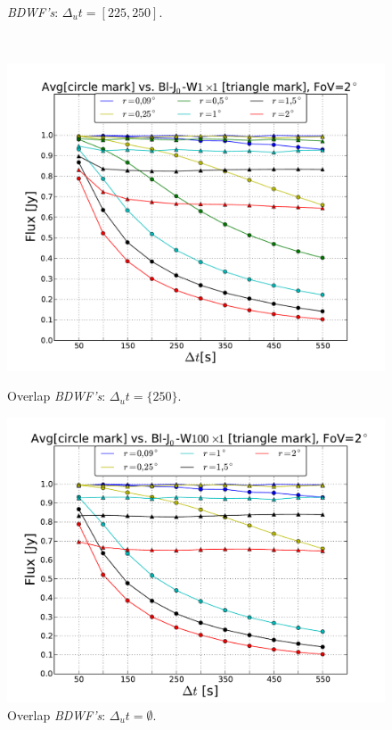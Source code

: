 \documentclass[useAMS,usenatbib]{mn2e}
\begin{document}
\begin{figure}
\begin{minipage}{0.45\linewidth}
{		\textit{BDWF's}: $\Delta_u t= [225, 250]$.}\label{ fig:fig_3a}\end{minipage}\\
\begin{minipage}{0.45\linewidth}\includegraphics[width=1\textwidth]{./Figures/max-integ-time-bessel-w1x1-fov2.pdf}\caption{Overlap 
		\textit{BDWF's}: $\Delta_u t=\{250\}$.}\label{fig:fig_4}\end{minipage}
\begin{minipage}{0.45\linewidth}\includegraphics[width=1\textwidth]{./Figures/max-integ-time-bessel-w100x1fov2.pdf}\caption{Overlap 
		\textit{BDWF's}: $\Delta_u t=\emptyset$.}\label{fig:fig_5}\end{minipage}
\end{figure}
\end{document}
